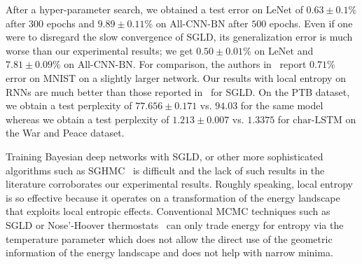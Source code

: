 \documentclass[10pt]{article}
\newcommand{\charlstm}{\textrm{char-LSTM}}
\newcommand{\lenet}{\textrm{LeNet}}
\newcommand{\allcnn}{\textrm{All-CNN-BN}}
\begin{document}
\begin{appendices}
After a hyper-parameter search, we obtained a test error on $\lenet$ of $0.63 \pm 0.1\%$ after $300$ epochs and $9.89 \pm 0.11\%$ on $\allcnn$ after $500$ epochs. Even if one were to disregard the slow convergence of SGLD, its generalization error is much worse than our experimental results; we get $0.50 \pm 0.01 \%$ on $\lenet$ and $7.81 \pm 0.09 \%$ on $\allcnn$. For comparison, the authors in~\citet{chen2015bridging} report $0.71\%$ error on MNIST on a slightly larger network. Our results with local entropy on RNNs are much better than those reported in~\citet{gan2016scalable} for SGLD. On the PTB dataset, we obtain a test perplexity of $77.656 \pm 0.171$ vs. $94.03$ for the same model whereas we obtain a test perplexity of $1.213 \pm 0.007$ vs. $1.3375$ for $\charlstm$ on the War and Peace dataset.

Training Bayesian deep networks with SGLD, or other more sophisticated algorithms such as SGHMC~\citep{chen2014stochastic,neal2011mcmc} is difficult and the lack of such results in the literature corroborates our experimental results. Roughly speaking, local entropy is so effective because it operates on a transformation of the energy landscape that exploits local entropic effects. Conventional MCMC techniques such as SGLD or Nose'-Hoover thermostats~\citep{ding2014bayesian} can only trade energy for entropy via the temperature parameter which does not allow the direct use of the geometric information of the energy landscape and does not help with narrow minima.

\end{appendices}
\end{document}
